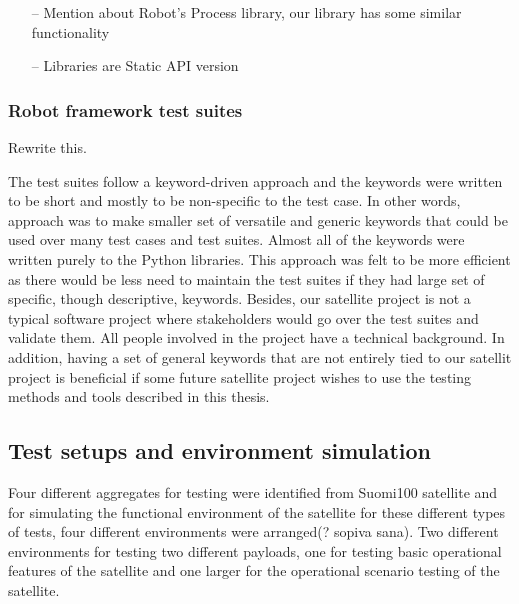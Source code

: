\documentclass[english,12pt,a4paper,pdftex,elec,utf8]{aaltothesis}
\begin{document}
 
\begin{itemize}
\item[--]Mention about Robot's Process library, our library has some similar functionality
\item[--]Libraries are Static API version 
\end{itemize}     
\subsubsection{Robot framework test suites}
Rewrite this.\par
The test suites follow a keyword-driven approach and the keywords were written to be short and mostly to be non-specific to the test case. In other words, approach was to make smaller set of versatile and generic keywords that could be used over many test cases and test suites. Almost all of the keywords were written purely to the Python libraries. This approach was felt to be more efficient as there would be less need to maintain the test suites if they had large set of specific, though descriptive, keywords. Besides, our satellite project is not a typical software project where stakeholders would go over the test suites and validate them. All people involved in the project have a technical background. In addition, having a set of general keywords that are not entirely tied to our satellit project is beneficial if some future satellite project wishes to use the testing methods and tools described in this thesis.\par 
\subsection{Test setups and environment simulation}
Four different aggregates for testing were identified from Suomi100 satellite and 
for simulating the functional environment of the satellite for these different types of tests, four different environments were arranged(? sopiva sana). Two different environments for testing two different payloads, one for testing basic operational features of the satellite and one larger for the operational scenario testing of the satellite. 
\end{document}
